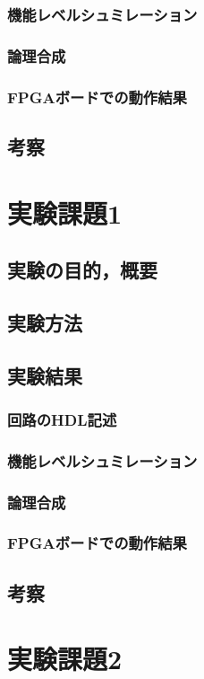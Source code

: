 \documentclass[a4paper,15pt]{jsarticle}
\begin{document}
\subsubsection{機能レベルシュミレーション}
\subsubsection{論理合成}
\subsubsection{FPGAボードでの動作結果}
\subsection{考察}

\section{実験課題1}
\subsection{実験の目的，概要}
\subsection{実験方法}
\subsection{実験結果}
\subsubsection{回路のHDL記述}
\subsubsection{機能レベルシュミレーション}
\subsubsection{論理合成}
\subsubsection{FPGAボードでの動作結果}
\subsection{考察}

\section{実験課題2}
\end{document}
